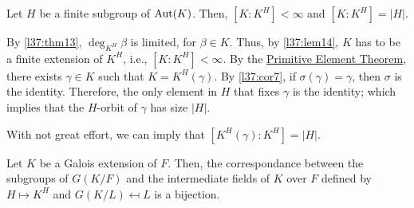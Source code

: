 \begin{thm}
	Let $H$ be a finite subgroup of $\operatorname{Aut}(K)$. Then, $[K : K^H] < \infty$ and $[K : K^H] = |H|$.
\end{thm}

\begin{dem}
	By \cref{l37:thm13}, $\deg_{K^H}\beta$ is limited, for  $\beta \in K$. Thus, by \cref{l37:lem14},  $K$ has to be a finite extension of $K^H$, i.e., $[K:K^H] < \infty$. By the \hyperlink{l34:thm8}{Primitive Element Theorem}, there exists $\gamma \in K$ such that $K = K^H(\gamma)$. By \cref{l37:cor7}, if $\sigma(\gamma) = \gamma$, then $\sigma$ is the identity. Therefore, the only element in $H$ that fixes $\gamma$ is the identity; which implies that the $H$-orbit of $\gamma$ has size $|H|$.

With not great effort, we can imply that $[K^H(\gamma) : K^H] = |H|$.
\end{dem}

\begin{thm}
	Let $K$ be a Galois extension of $F$. Then, the correspondance between the subgroups of $G(K/F)$ and the intermediate fields of $K$ over $F$ defined by $H \mapsto K^H$ and $G(K/L) \mapsfrom L$ is a bijection.
\end{thm}


